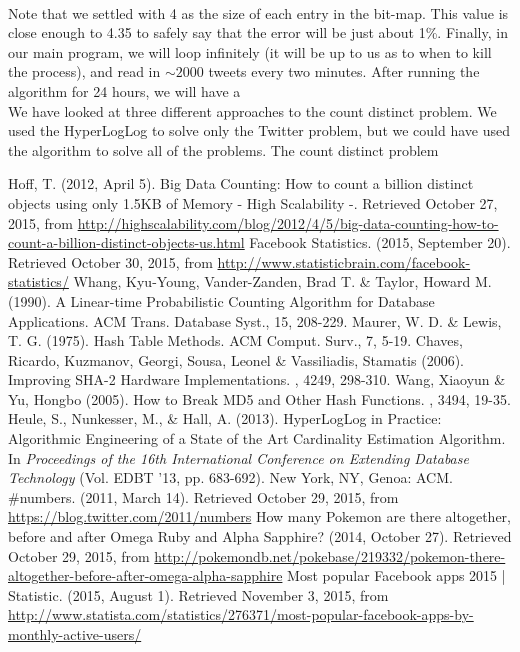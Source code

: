 \documentclass{article}
\begin{document}
\noindent \\
Note that we settled with 4 as the size of each entry in the bit-map. This value is close enough to 4.35 to safely say that the error will be just about 1\%.
Finally, in our main program, we will loop infinitely (it will be up to us as to when to kill the process), and read in $\sim 2000$ tweets every two minutes. 
After running the algorithm for 24 hours, we will have a\\ 
\indent We have looked at three different approaches to the count distinct problem. 
We used the HyperLogLog to solve only the Twitter problem, but we could have used the algorithm to solve all of the problems. 
The count distinct problem 


\newpage
\begin{thebibliography}{9}
 Hoff, T. (2012, April 5). Big Data Counting: How to count a billion distinct objects using only 1.5KB of Memory - High Scalability -. Retrieved October 27, 2015, from \url{http://highscalability.com/blog/2012/4/5/big-data-counting-how-to-count-a-billion-distinct-objects-us.html}
 Facebook Statistics. (2015, September 20). Retrieved October 30, 2015, from \url{http://www.statisticbrain.com/facebook-statistics/}
 Whang, Kyu-Young, Vander-Zanden, Brad T. \& Taylor, Howard M. (1990). A Linear-time Probabilistic Counting Algorithm for Database Applications. ACM Trans. Database Syst., 15, 208-229.
 Maurer, W. D. \& Lewis, T. G. (1975). Hash Table Methods. ACM Comput. Surv., 7, 5-19.
 Chaves, Ricardo, Kuzmanov, Georgi, Sousa, Leonel \& Vassiliadis, Stamatis (2006). Improving SHA-2 Hardware Implementations. , 4249, 298-310.
 Wang, Xiaoyun \& Yu, Hongbo (2005). How to Break MD5 and Other Hash Functions. , 3494, 19-35.
 Heule, S., Nunkesser, M., \& Hall, A. (2013). HyperLogLog in Practice: Algorithmic Engineering of a State of the Art Cardinality Estimation Algorithm. In \textit{Proceedings of the 16th International Conference on Extending Database Technology} (Vol. EDBT '13, pp. 683-692). New York, NY, Genoa: ACM.
 \#numbers. (2011, March 14). Retrieved October 29, 2015, from \url{https://blog.twitter.com/2011/numbers}
 How many Pokemon are there altogether, before and after Omega Ruby and Alpha Sapphire? (2014, October 27). Retrieved October 29, 2015, from \url{http://pokemondb.net/pokebase/219332/pokemon-there-altogether-before-after-omega-alpha-sapphire}
 Most popular Facebook apps 2015 | Statistic. (2015, August 1). Retrieved November 3, 2015, from \url{http://www.statista.com/statistics/276371/most-popular-facebook-apps-by-monthly-active-users/}

\end{thebibliography}
\end{document}
